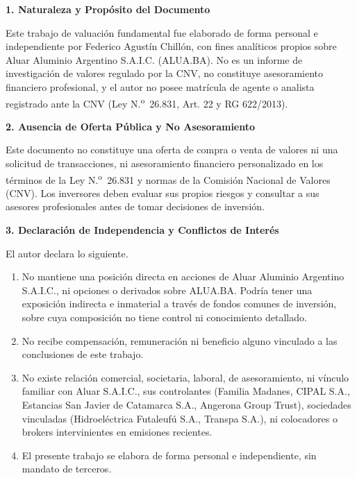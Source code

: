 \documentclass[11pt,a4paper]{article}
\begin{document}
\noindent
\begin{tcolorbox}[colback=white, colframe=gsnavy, boxrule=0.8pt, arc=3pt, left=8pt, right=8pt, top=6pt, bottom=6pt]
    \small
    \textbf{\color{gsnavy} 1. Naturaleza y Propósito del Documento}\\[2pt]
    {Este trabajo de valuación fundamental fue elaborado de forma personal e independiente por Federico Agustín Chillón, con fines analíticos propios sobre Aluar Aluminio Argentino S.A.I.C. (ALUA.BA). No es un informe de investigación de valores regulado por la CNV, no constituye asesoramiento financiero profesional, y el autor no posee matrícula de agente o analista registrado ante la CNV (Ley N.\textsuperscript{o}~26.831, Art. 22 y RG 622/2013).\par}

    \vspace{0.12cm}
    \textbf{\color{gsnavy} 2. Ausencia de Oferta Pública y No Asesoramiento}\\[2pt]
    {Este documento no constituye una oferta de compra o venta de valores ni una solicitud de transacciones, ni asesoramiento financiero personalizado en los términos de la Ley N.\textsuperscript{o}~26.831 y normas de la Comisión Nacional de Valores (CNV). Los inversores deben evaluar sus propios riesgos y consultar a sus asesores profesionales antes de tomar decisiones de inversión.\par}

    \vspace{0.12cm}
    \textbf{\color{gsnavy} 3. Declaración de Independencia y Conflictos de Interés}\\[2pt]
    {El autor declara lo siguiente.
    \setlength{\itemsep}{0pt}\setlength{\parsep}{0pt}\setlength{\topsep}{2pt}
    \begin{enumerate}
        \item No mantiene una posición directa en acciones de Aluar Aluminio Argentino S.A.I.C., ni opciones o derivados sobre ALUA.BA. Podría tener una exposición indirecta e inmaterial a través de fondos comunes de inversión, sobre cuya composición no tiene control ni conocimiento detallado.
        \item No recibe compensación, remuneración ni beneficio alguno vinculado a las conclusiones de este trabajo.
        \item No existe relación comercial, societaria, laboral, de asesoramiento, ni vínculo familiar con Aluar S.A.I.C., sus controlantes (Familia Madanes, CIPAL S.A., Estancias San Javier de Catamarca S.A., Angerona Group Trust), sociedades vinculadas (Hidroeléctrica Futaleufú S.A., Transpa S.A.), ni colocadores o brokers intervinientes en emisiones recientes.
        \item El presente trabajo se elabora de forma personal e independiente, sin mandato de terceros.
    \end{enumerate}\par}
\end{tcolorbox}
\end{document}
